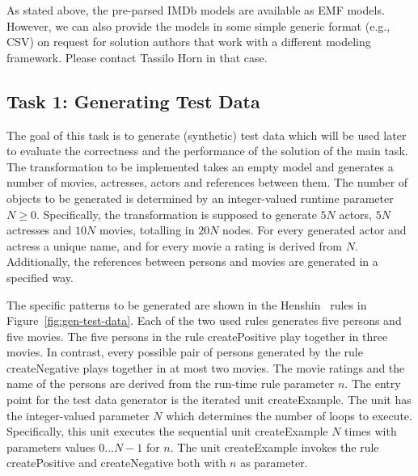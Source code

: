 \documentclass[a4paper,11pt]{article}
\begin{document}
As stated above, the pre-parsed IMDb models are available as EMF models.
However, we can also provide the models in some simple generic format (e.g.,
CSV) on request for solution authors that work with a different modeling
framework.  Please contact Tassilo Horn in that case.


\subsection{Task 1: Generating Test Data}
\label{sec:gen-test-data}


The goal of this task is to generate (synthetic) test data which will be used
later to evaluate the correctness and the performance of the solution of the 
main task. The transformation to be implemented takes an empty model and 
generates a number of movies, actresses, actors and references between them.
The number of objects to be generated is determined by an integer-valued 
runtime parameter $N\geq0$. Specifically, the transformation is supposed
to generate $5N$ actors, $5N$ actresses and $10N$ movies, totalling in 
$20N$ nodes. For every generated actor and actress a unique name, and for 
every movie a rating is derived from $N$. Additionally, the references between
persons and movies are generated in a specified way.

The specific patterns to be generated are shown in the Henshin~\cite{ABJ+10}
rules in Figure~\ref{fig:gen-test-data}.  Each of the two used rules generates
five persons and five movies. The five persons in the rule
\textsf{createPositive} play together in three movies.  In contrast, every
possible pair of persons generated by the rule \textsf{createNegative} plays
together in at most two movies.
The movie ratings and the name of the persons are derived from the run-time
rule parameter $n$. The entry point for the test data generator is the iterated
unit \textsf{createExample}. The unit has the integer-valued parameter $N$
which determines the number of loops to execute. Specifically, this unit 
executes the sequential unit \textsf{createExample} $N$ times with parameters
values $0\ldots N-1$ for $n$. The unit \textsf{createExample} invokes the rule
\textsf{createPositive} and \textsf{createNegative} both with $n$ as parameter.
\end{document}
